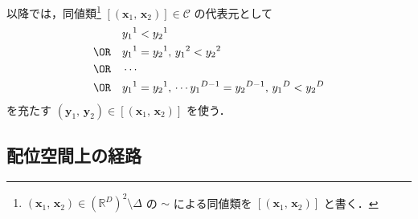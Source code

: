\documentclass[TQFT_main]{subfiles}
\begin{document}
\begin{marker}
    以降では，同値類\footnote{$(\bm{x}_1,\, \bm{x}_2) \in (\mathbb{R}^D)^2 \setminus \Delta$ の $\sim$ による同値類を $[(\bm{x}_1,\, \bm{x}_2)]$ と書く．} $[(\bm{x}_1,\, \bm{x}_2)] \in \mathcal{C}$ の代表元として
    \begin{align}
        &y_1{}^1 < y_2{}^1 \\ 
        \OR \quad&y_1{}^1 = y_2{}^1,\, y_1{}^2 < y_2{}^2 \\
        \OR \quad&\cdots \\
        \OR \quad&y_1{}^1 = y_2{}^1,\, \cdots y_1{}^{D-1} = y_2{}^{D-1},\, y_1{}^D < y_2{}^D
    \end{align}
    を充たす $(\bm{y}_1,\, \bm{y}_2) \in [(\bm{x}_1,\, \bm{x}_2)]$ を使う．
\end{marker}



\subsection{配位空間上の経路}
\end{document}
